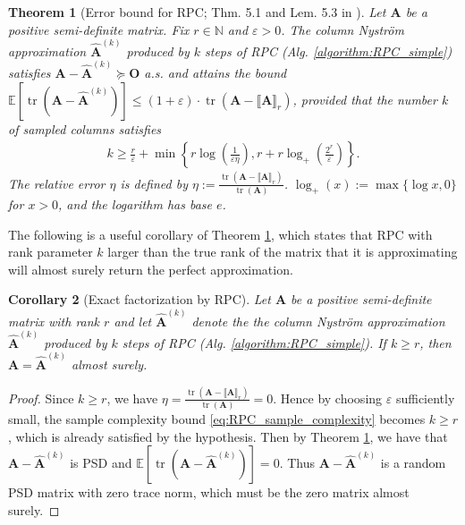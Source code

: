 \documentclass[11pt]{amsart}
\theoremstyle{plain}
\newtheorem{theorem}{Theorem}[section]
\newtheorem{corollary}[theorem]{Corollary}
\theoremstyle{definition}
\theoremstyle{remark}
\def\eps{\varepsilon}
\def\A{\mathbf{A}}
\begin{document}
\begin{theorem}[Error bound for RPC; Thm. 5.1 and Lem. 5.3 in  \cite{chen2022randomly}]\label{thm:RPC}
    Let $\A$ be a positive semi-definite  matrix. Fix \( r \in \mathbb{N} \) and \( \varepsilon > 0 \). The column
Nystr\"{o}m approximation \( \hat{\A}^{(k)} \) produced by \( k \) steps of RPC (Alg. \ref{algorithm:RPC_simple}) satisfies $\A-\hat{\A}^{(k)}\succeq \mathbf{O}$ a.s. and attains the bound $\mathbb{E}\left[ \operatorname{tr}(\A - \hat{\A}^{(k)}) \right] \leq (1 + \varepsilon) \cdot \operatorname{tr}(\A - \llbracket\A \rrbracket_r)$, 
provided that the number \( k \) of sampled columns satisfies
\begin{align}\label{eq:RPC_sample_complexity}
k \geq \frac{r}{\varepsilon} + \min \left\{ r \log \left(\frac{1}{\eps \eta}\right), r + r \log_{+} \left(\frac{2^r}{\varepsilon}\right) \right\}.
\end{align}
The relative error \( \eta \) is defined by \( \eta := \frac{\operatorname{tr}(\A - \llbracket\A \rrbracket_r)}{\operatorname{tr}(\A)} \). \( \log_{+}(x) := \max\{\log x, 0\} \) for \( x > 0 \), and the logarithm has base \( e \).

\end{theorem}

The following is a useful corollary of Theorem \ref{thm:RPC}, which states that RPC with rank parameter $k$ larger than the true rank of the matrix that it is approximating will almost surely return the perfect approximation.  

\begin{corollary}[Exact factorization by RPC]\label{cor:RPC_exact}
     Let $\A$ be a positive semi-definite  matrix with rank $r$ and let $\hat{\A}^{(k)}$ denote the the column
Nystr\"{o}m approximation \( \hat{\A}^{(k)} \) produced by \( k \) steps of RPC (Alg. \ref{algorithm:RPC_simple}). If $k\ge r$, then $\A=\hat{\A}^{(k)}$ almost surely. 
\end{corollary}

\begin{proof}
    Since $k\ge r$, we have $\eta = \frac{\operatorname{tr}(\A - \llbracket\A \rrbracket_r)}{\operatorname{tr}(\A)} =0$. Hence by choosing $\eps$ sufficiently small, the sample complexity bound \eqref{eq:RPC_sample_complexity} becomes $k\ge r$, which is already satisfied by the hypothesis. Then by Theorem \ref{thm:RPC}, we have that $\A-\hat{\A}^{(k)}$ is PSD and $\mathbb{E}\left[ \operatorname{tr}(\A - \hat{\A}^{(k)}) \right] = 0$. Thus $\A-\hat{\A}^{(k)}$ is a random PSD matrix with zero trace norm, which must be the zero matrix almost surely. 
\end{proof}
\end{document}
